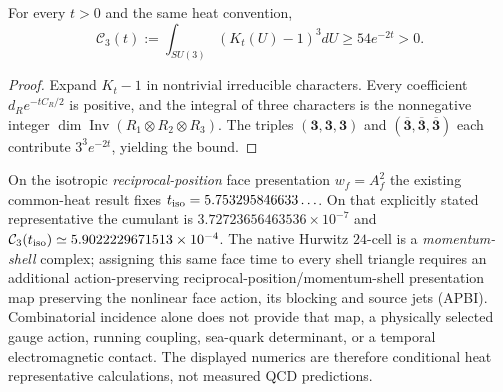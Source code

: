 \documentclass[12pt,a4paper]{article}
\begin{document}
\begin{proposition}
\label{p10:prop:v356-heat-star-cubic}
For every $t>0$ and the same heat convention,
\[
 \boxed{\mathcal C_3(t):=\int_{SU(3)}(K_t(U)-1)^3dU
             \ge54e^{-2t}>0.}
\]
\end{proposition}
\begin{proof}
Expand $K_t-1$ in nontrivial irreducible characters.
Every coefficient $d_Re^{-tC_R/2}$ is positive, and the integral
of three characters is the nonnegative integer
$\dim\operatorname{Inv}(R_1\otimes R_2\otimes R_3)$.
The triples $(\mathbf3,\mathbf3,\mathbf3)$ and
$(\overline{\mathbf3},\overline{\mathbf3},
\overline{\mathbf3})$ each contribute
$3^3e^{-2t}$, yielding the bound.
\end{proof}

\begin{remark}
\label{p10:rem:v356-apbi-frontier}
On the isotropic \emph{reciprocal-position} face presentation
$w_f=A_f^2$ the existing common-heat result fixes
$t_{\rm iso}=5.753295846633\ldots$.  On that explicitly stated
representative the cumulant is $3.72723656463536\times10^{-7}$
and $\mathcal C_3(t_{\rm iso})\simeq5.9022229671513\times10^{-4}$.
The native Hurwitz $24$-cell is a \emph{momentum-shell} complex;
assigning this same face time to every shell triangle requires an
additional action-preserving reciprocal-position/momentum-shell
presentation map preserving the nonlinear face action, its blocking
and source jets (APBI).  Combinatorial incidence alone does not
provide that map, a physically selected gauge action, running
coupling, sea-quark determinant, or a temporal electromagnetic
contact.  The displayed numerics are therefore conditional heat
representative calculations, not measured QCD predictions.
\end{remark}


\clearpage
\end{document}
